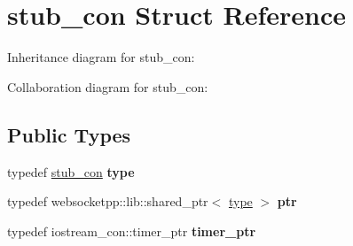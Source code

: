 \hypertarget{structstub__con}{}\section{stub\+\_\+con Struct Reference}
\label{structstub__con}


Inheritance diagram for stub\+\_\+con\+:


Collaboration diagram for stub\+\_\+con\+:
\subsection*{Public Types}
\begin{DoxyCompactItemize}
\item 
\mbox{\label{structstub__con_a5ca630044e6795a895c38ea34a757c22}} 
typedef \mbox{\hyperlink{structstub__con}{stub\+\_\+con}} {\bfseries type}
\item 
\mbox{\label{structstub__con_a98ad8f9925a9530ac1a8e4406e4a2287}} 
typedef websocketpp\+::lib\+::shared\+\_\+ptr$<$ \mbox{\hyperlink{structstub__con}{type}} $>$ {\bfseries ptr}
\item 
\mbox{\label{structstub__con_abb094936e96fb9d205f435a36bb3c19a}} 
typedef iostream\+\_\+con\+::timer\+\_\+ptr {\bfseries timer\+\_\+ptr}
\end{DoxyCompactItemize}
